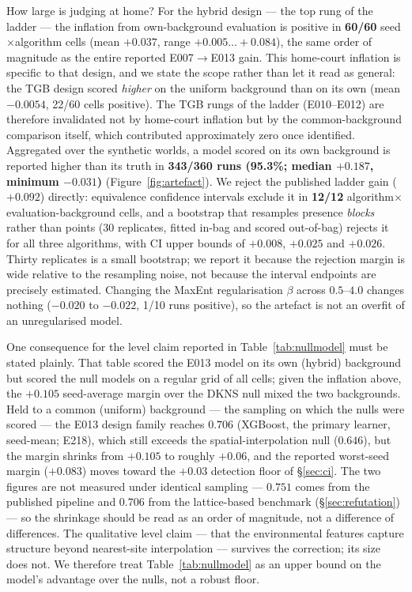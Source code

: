 \documentclass[12pt]{article}
\begin{document}
How large is judging at home?
For the hybrid design --- the top rung of the ladder --- the inflation from own-background evaluation is positive in \textbf{60/60} seed$\times$algorithm cells (mean $+0.037$, range $+0.005 \ldots +0.084$), the same order of magnitude as the entire reported E007$\rightarrow$E013 gain.
This home-court inflation is specific to that design, and we state the scope rather than let it read as general: the TGB design scored \emph{higher} on the uniform background than on its own (mean $-0.0054$, 22/60 cells positive).
The TGB rungs of the ladder (E010--E012) are therefore invalidated not by home-court inflation but by the common-background comparison itself, which contributed approximately zero once identified.
Aggregated over the synthetic worlds, a model scored on its own background is reported higher than its truth in \textbf{343/360 runs (95.3\%; median $+0.187$, minimum $-0.031$)} (Figure~\ref{fig:artefact}).
We reject the published ladder gain ($+0.092$) directly: equivalence confidence intervals exclude it in \textbf{12/12} algorithm$\times$evaluation-background cells, and a bootstrap that resamples presence \emph{blocks} rather than points (30 replicates, fitted in-bag and scored out-of-bag) rejects it for all three algorithms, with CI upper bounds of $+0.008$, $+0.025$ and $+0.026$. Thirty replicates is a small bootstrap; we report it because the rejection margin is wide relative to the resampling noise, not because the interval endpoints are precisely estimated.
Changing the MaxEnt regularisation $\beta$ across $0.5$--$4.0$ changes nothing ($-0.020$ to $-0.022$, 1/10 runs positive), so the artefact is not an overfit of an unregularised model.

One consequence for the level claim reported in Table~\ref{tab:nullmodel} must be stated plainly.
That table scored the E013 model on its own (hybrid) background but scored the null models on a regular grid of all cells; given the inflation above, the $+0.105$ seed-average margin over the DKNS null mixed the two backgrounds.
Held to a common (uniform) background --- the sampling on which the nulls were scored --- the E013 design family reaches $0.706$ (XGBoost, the primary learner, seed-mean; E218), which still exceeds the spatial-interpolation null ($0.646$), but the margin shrinks from $+0.105$ to roughly $+0.06$, and the reported worst-seed margin ($+0.083$) moves toward the $+0.03$ detection floor of \S\ref{sec:ci}.
The two figures are not measured under identical sampling --- $0.751$ comes from the published pipeline and $0.706$ from the lattice-based benchmark (\S\ref{sec:refutation}) --- so the shrinkage should be read as an order of magnitude, not a difference of differences.
The qualitative level claim --- that the environmental features capture structure beyond nearest-site interpolation --- survives the correction; its size does not.
We therefore treat Table~\ref{tab:nullmodel} as an upper bound on the model's advantage over the nulls, not a robust floor.
\end{document}

